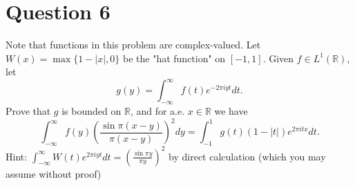 \section{Question 6}

\begin{question}
    [15 points] Note that functions in this problem are complex-valued. Let $W(x)=\max \{1-|x|, 0\}$ be the "hat function" on $[-1,1]$. Given $f \in L^1(\mathbb{R})$, let
    $$
    g(y)=\int_{-\infty}^{\infty} f(t) e^{-2 \pi i y t} d t .
    $$
    Prove that $g$ is bounded on $\mathbb{R}$, and for a.e. $x \in \mathbb{R}$ we have
    $$
    \int_{-\infty}^{\infty} f(y)\left(\frac{\sin \pi(x-y)}{\pi(x-y)}\right)^2 d y=\int_{-1}^1 g(t)(1-|t|) e^{2 \pi i t x} d t .
    $$
    Hint: $\int_{-\infty}^{\infty} W(t) e^{2 \pi i y t} d t=\left(\frac{\sin \pi y}{\pi y}\right)^2$ by direct calculation (which you may assume without proof)
\end{question}

